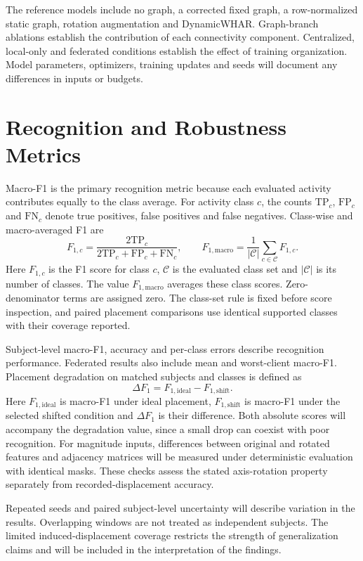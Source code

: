\documentclass[10pt,a4paper,oneside,openany]{report}
\begin{document}
The reference models include no graph, a corrected fixed graph, a row-normalized static graph, rotation augmentation and DynamicWHAR. Graph-branch ablations establish the contribution of each connectivity component. Centralized, local-only and federated conditions establish the effect of training organization. Model parameters, optimizers, training updates and seeds will document any differences in inputs or budgets.

\section{Recognition and Robustness Metrics}

Macro-F1 is the primary recognition metric because each evaluated activity contributes equally to the class average. For activity class $c$, the counts $\mathrm{TP}_c$, $\mathrm{FP}_c$ and $\mathrm{FN}_c$ denote true positives, false positives and false negatives. Class-wise and macro-averaged F1 are
\[
F_{1,c}=\frac{2\mathrm{TP}_c}{2\mathrm{TP}_c+\mathrm{FP}_c+\mathrm{FN}_c},\qquad
F_{1,\mathrm{macro}}=\frac{1}{|\mathcal C|}\sum_{c\in\mathcal C}F_{1,c}.
\]
Here $F_{1,c}$ is the F1 score for class $c$, $\mathcal C$ is the evaluated class set and $|\mathcal C|$ is its number of classes. The value $F_{1,\mathrm{macro}}$ averages these class scores. Zero-denominator terms are assigned zero. The class-set rule is fixed before score inspection, and paired placement comparisons use identical supported classes with their coverage reported.

Subject-level macro-F1, accuracy and per-class errors describe recognition performance. Federated results also include mean and worst-client macro-F1. Placement degradation on matched subjects and classes is defined as
\[
\Delta F_1=F_{1,\mathrm{ideal}}-F_{1,\mathrm{shift}}.
\]
Here $F_{1,\mathrm{ideal}}$ is macro-F1 under ideal placement, $F_{1,\mathrm{shift}}$ is macro-F1 under the selected shifted condition and $\Delta F_1$ is their difference. Both absolute scores will accompany the degradation value, since a small drop can coexist with poor recognition. For magnitude inputs, differences between original and rotated features and adjacency matrices will be measured under deterministic evaluation with identical masks. These checks assess the stated axis-rotation property separately from recorded-displacement accuracy.

Repeated seeds and paired subject-level uncertainty will describe variation in the results. Overlapping windows are not treated as independent subjects. The limited induced-displacement coverage restricts the strength of generalization claims and will be included in the interpretation of the findings.
\end{document}
